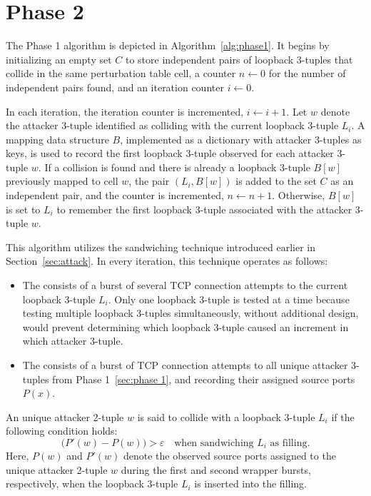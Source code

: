 \documentclass{report}
\begin{document}
\section{Phase 2}
\label{sec:phase 2}

The Phase 1 algorithm is depicted in Algorithm~\ref{alg:phase1}. It begins by initializing an empty set $C$ to store \alert{independent pairs of loopback 3-tuples} that collide in the same perturbation table cell, a counter $n \leftarrow 0$ for the \alert{number of independent pairs found}, and an \alert{iteration counter} $i \leftarrow 0$.

In each iteration, the iteration counter is incremented, \(i \leftarrow i+1\). Let \(w\) denote the attacker 3-tuple identified as colliding with the current loopback 3-tuple \(L_i\). A mapping data structure \(B\), implemented as a \alert{dictionary} with attacker 3-tuples as keys, is used to record the first loopback 3-tuple observed for each attacker 3-tuple \(w\). \alert{If a collision is found} and there is already a loopback 3-tuple \(B[w]\) previously mapped to cell \(w\), the pair \((L_i, B[w])\) is added to the set \(C\) as an independent pair, and the counter is incremented, \(n \leftarrow n+1\). \alert{Otherwise}, \(B[w]\) is set to \(L_i\) to remember the first loopback 3-tuple associated with the attacker 3-tuple \(w\).

This algorithm utilizes the sandwiching technique introduced earlier in Section~\ref{sec:attack}. In every iteration, this technique operates as follows:
\begin{itemize}
  \item The  consists of a burst of several TCP connection attempts to the current loopback 3-tuple $L_i$. Only one loopback 3-tuple is tested at a time because testing multiple loopback 3-tuples simultaneously, without additional design, would prevent determining which loopback 3-tuple caused an increment in which attacker 3-tuple.
  \item The  consists of a burst of TCP connection attempts to all unique attacker 3-tuples from Phase 1~\ref{sec:phase 1}, and recording their assigned source ports $P(x)$.
\end{itemize}

An \alert{unique attacker 2-tuple \(w\)} is said to collide with a \alert{loopback 3-tuple \(L_i\)} if the following \alert{condition} holds:
\begin{equation*}
	\bigl(P'(w) - P(w)\bigr) > \varepsilon
	\quad \text{when sandwiching } L_i \text{ as filling.}
\end{equation*}
Here, \(P(w)\) and \(P'(w)\) denote the observed \alert{source ports assigned to} the \alert{unique attacker 2-tuple \(w\)} during the first and second wrapper bursts, respectively, when the loopback 3-tuple \(L_i\) is inserted into the filling.
\end{document}
